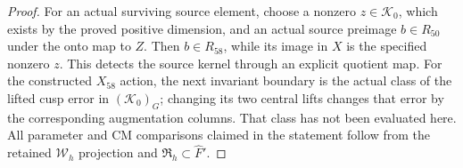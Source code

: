 \begin{proof}
For an actual surviving source element,
choose a nonzero \(z\in\mathcal K_0\),
which exists by the proved positive
dimension, and an actual source preimage
\(b\in R_{50}\) under the onto map to
\(Z\). Then \(b\in R_{58}\), while
its image in \(X\) is the specified
nonzero \(z\). This detects the source
kernel through an explicit quotient map.
For the constructed \(X_{58}\) action,
the next invariant boundary is the
actual class of the lifted cusp error
in \((\mathcal K_0)_G\); changing its
two central lifts changes that error
by the corresponding augmentation
columns. That class has not been
evaluated here. All parameter and CM
comparisons claimed in the statement
follow from the retained
\(\mathcal W_h\) projection and
\(\mathfrak R_h\subset\widehat F'\).
\end{proof}

